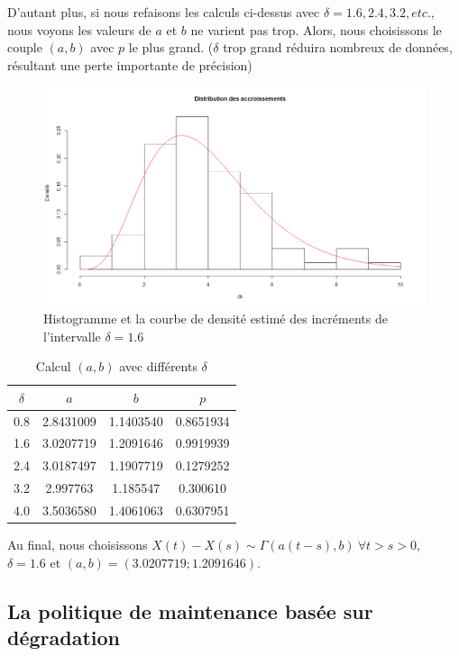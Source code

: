 \documentclass[10pt,a4paper]{article}
\begin{document}
D'autant plus, si nous refaisons les calculs ci-dessus avec $\delta = 1.6, 2.4, 3.2, etc.$, nous voyons les valeurs de $a$ et $b$ ne varient pas trop. Alors, nous choisissons le couple $(a,b)$ avec $p$ le plus grand. ($\delta$ trop grand réduira nombreux de données, résultant une perte importante de précision)

\begin{figure}[!h]
    \centering
    \includegraphics[width=\textwidth]{img/histo_dens_degrad_1_6.png}
    \caption{Histogramme et la courbe de densité estimé des incréments de l'intervalle $\delta = 1.6$}
    \label{fig:histo_dens_degrad_1_6}
\end{figure}

\begin{table}[!h]
    \centering
    \begin{tabular}{|c|c|c|c|}
        \hline
        $\delta$ & $a$ & $b$ & $p$ \\
        \hline
        0.8 & 2.8431009 & 1.1403540 & 0.8651934\\
        1.6 & 3.0207719 & 1.2091646 & 0.9919939\\
        2.4 & 3.0187497 & 1.1907719 & 0.1279252\\
        3.2 & 2.997763 & 1.185547 & 0.300610\\
        4.0 & 3.5036580 & 1.4061063 & 0.6307951\\
        \hline
    \end{tabular}
    \caption{Calcul $(a,b)$ avec différents $\delta$}
\end{table}

Au final, nous choisissons $X(t) - X(s) \sim \Gamma(a(t-s),b)\  \forall t > s > 0$, $\delta=1.6$ et $(a,b) = (3.0207719;1.2091646)$.

\subsection{La politique de maintenance basée sur dégradation}
\end{document}
